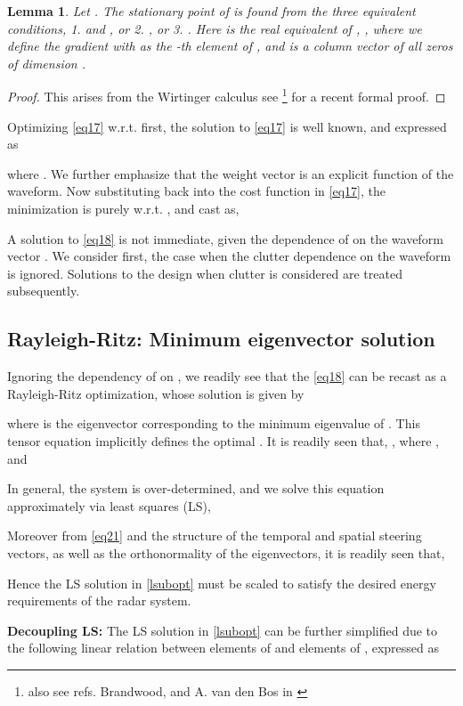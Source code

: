 \documentclass[11pt,draftclsnofoot,onecolumn]{IEEEtran}
\newtheorem{lem}{\bf {Lemma}}
\theoremstyle{definition}
\theoremstyle{remark}
\begin{document}
\begin{lem}\label{crlemma}
Let . The stationary point of  is found from the three equivalent conditions, 1.   and , or 2. , or 3. . Here   is the real equivalent of , , where we define the gradient  with  as the -th element of , and  is a column vector of all zeros of dimension .
\end{lem}
\begin{proof}
This arises from the Wirtinger calculus see \cite{Gesbert2007} \footnote{ also see refs. Brandwood, and A. van den Bos in \cite{Gesbert2007} } for a recent formal proof.
\end{proof}
Optimizing \eqref{eq17} w.r.t.  first, the solution to \eqref{eq17} is well known, and expressed as

where .  We further emphasize that the  weight vector is an explicit function of the waveform.  Now substituting  back into the cost function in \eqref{eq17}, the minimization is purely w.r.t. , and cast as,

A solution to \eqref{eq18} is not immediate, given the dependence of   on the waveform vector . We consider first, the case when the clutter dependence on the waveform is ignored. Solutions to the design when clutter is considered are treated subsequently.

\subsection{Rayleigh-Ritz: Minimum eigenvector solution}
Ignoring the dependency of  on , we readily see that the \eqref{eq18} can be recast as a Rayleigh-Ritz optimization, whose solution is given by

where  is the eigenvector corresponding to the minimum eigenvalue of . This tensor equation implicitly defines the optimal . It is readily seen that, , where , and 

In general, the system is over-determined, and we solve this equation approximately via least squares (LS), 

Moreover from \eqref{eq21} and the structure of the temporal and spatial steering vectors,  as well as the orthonormality of the eigenvectors, it is readily seen that,

Hence  the LS solution in \eqref{lsubopt} must be scaled to satisfy the desired energy requirements of the radar system.
 
 {\bf Decoupling LS:} The LS solution in \eqref{lsubopt} can be further simplified due to the following linear relation between elements of  and elements of , expressed as
\end{document}
